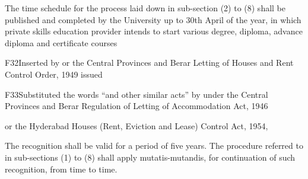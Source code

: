 \documentclass[reprint]{mhact}
\begin{document}
\begin{subsectionlist}
 The time schedule for the process laid down in sub-section
(2) to (8) shall be published and completed by the University up to
30th April of the year, in which private skills education provider
intends to start various degree, diploma, advance diploma and
certificate courses
\begin{amendins}{F32}{Inserted by }
or the
Central Provinces and Berar Letting of Houses and Rent Control Order,
1949 issued
\begin{amendins}{F33}{Substituted the words ``and other similar acts'' by
    }
  under the Central Provinces and Berar Regulation of
  Letting of Accommodation Act, 1946
\end{amendins}
  or the Hyderabad Houses (Rent,
Eviction and Lease) Control Act, 1954,
\end{amendins}
The recognition shall be valid for a period of five years. The procedure referred to in sub-sections (1) to (8) shall apply mutatis-mutandis, for continuation of such recognition, from time to time.

       \end{subsectionlist}
    
\end{document}
